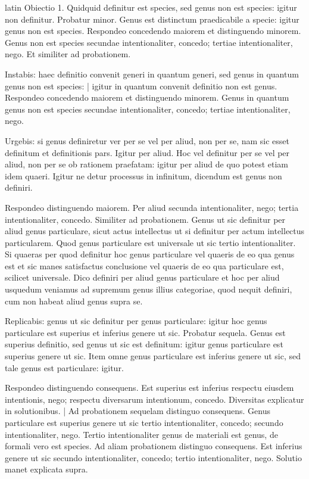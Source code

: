\begin{otherlanguage*}{latin}
\pstart
  Obiectio 1. Quidquid definitur est species, sed genus non est species: igitur non definitur. Probatur minor. Genus est distinctum praedicabile a specie: igitur genus non est species. Respondeo concedendo maiorem et distinguendo minorem. Genus non est species secundae intentionaliter, concedo; tertiae intentionaliter, nego. Et similiter ad probationem. 
\pend

\pstart
  Instabis: haec definitio convenit generi in quantum generi, sed genus in quantum genus non est species: \textnormal{|} igitur in quantum convenit definitio non est genus. Respondeo concedendo maiorem et distinguendo minorem. Genus in quantum genus non est species secundae intentionaliter, concedo; tertiae intentionaliter, nego. 
\pend

\pstart
  Urgebis: si genus definiretur ver per se vel per aliud, non per se, nam sic esset definitum et definitionis pars. Igitur per aliud. Hoc vel definitur per se vel per aliud, non per se ob rationem praefatam: igitur per aliud de quo potest etiam idem quaeri. Igitur ne detur processus in infinitum, dicendum est genus non definiri. 
\pend

\pstart
  Respondeo distinguendo maiorem. Per aliud secunda intentionaliter, nego; tertia intentionaliter, concedo. Similiter ad probationem. Genus ut sic definitur per aliud genus particulare, sicut actus intellectus ut si definitur per actum intellectus particularem. Quod genus particulare est universale ut sic tertio intentionaliter. Si quaeras per quod definitur hoc genus particulare vel quaeris de eo qua genus est et sic manes satisfactus conclusione vel quaeris de eo qua particulare est, scilicet universale. Dico definiri per aliud genus particulare et hoc per aliud usquedum veniamus ad supremum genus illius categoriae, quod nequit definiri, cum non habeat aliud genus supra se. 
\pend

\pstart
  Replicabis: genus ut sic definitur per genus particulare: igitur hoc genus particulare est superius et inferius genere ut sic. Probatur sequela. Genus est superius definitio, sed genus ut sic est definitum: igitur genus particulare est superius genere ut sic. Item omne genus particulare est inferius genere ut sic, sed tale genus est particulare: igitur. 
\pend

\pstart
  Respondeo distinguendo consequens. Est superius est inferius respectu eiusdem intentionis, nego; respectu diversarum intentionum, concedo. Diversitas explicatur in solutionibus. \textnormal{|}   Ad probationem sequelam distinguo consequens. Genus particulare est superius genere ut sic tertio intentionaliter, concedo; secundo intentionaliter, nego. Tertio intentionaliter genus de materiali est genus, de formali vero est species. Ad aliam probationem distinguo consequens. Est inferius genere ut sic secundo intentionaliter, concedo; tertio intentionaliter, nego. Solutio manet explicata supra. 
\pend


\end{otherlanguage*}
